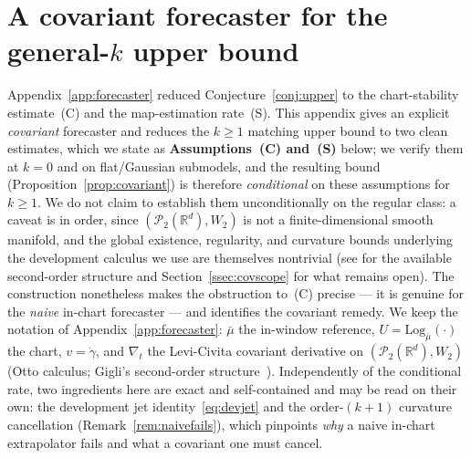 \documentclass[11pt]{article}
\theoremstyle{definition}
\theoremstyle{remark}
\newcommand{\R}{\mathbb{R}}
\newcommand{\PP}{\mathcal{P}_2(\R^d)}
\begin{document}
\section{A covariant forecaster for the general-$k$ upper bound}\label{app:covariant}
Appendix~\ref{app:forecaster} reduced Conjecture~\ref{conj:upper} to the chart-stability
estimate~(C) and the map-estimation rate~(S). This appendix gives an explicit \emph{covariant}
forecaster and reduces the $k\ge1$ matching upper bound to two clean estimates, which we state as
\textbf{Assumptions~(C) and~(S)} below; we verify them at $k=0$ and on flat/Gaussian submodels, and
the resulting bound (Proposition~\ref{prop:covariant}) is therefore \emph{conditional} on these
assumptions for $k\ge1$. We do not claim to establish them unconditionally on the regular class: a
caveat is in order, since $(\PP,W_2)$ is not a finite-dimensional smooth manifold, and the global
existence, regularity, and curvature bounds underlying the development calculus we use are themselves
nontrivial (see \cite{ags,gigli} for the available second-order structure and
Section~\ref{ssec:covscope} for what remains open). The construction nonetheless makes the obstruction
to~(C) precise --- it is genuine for the \emph{naive} in-chart forecaster --- and identifies the
covariant remedy. We keep the notation of Appendix~\ref{app:forecaster}: $\bar\mu$ the in-window
reference, $U=\mathrm{Log}_{\bar\mu}(\cdot)$ the chart, $v=\dot\gamma$, and $\nabla_t$ the
Levi-Civita covariant derivative on $(\PP,W_2)$ (Otto calculus; Gigli's second-order
structure~\cite{gigli}). Independently of the conditional rate, two ingredients here are exact and
self-contained and may be read on their own: the development jet identity~\eqref{eq:devjet} and the
order-$(k{+}1)$ curvature cancellation (Remark~\ref{rem:naivefails}), which pinpoints \emph{why} a
naive in-chart extrapolator fails and what a covariant one must cancel.
\end{document}
